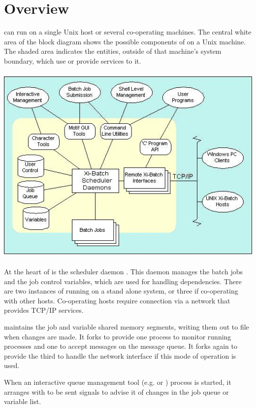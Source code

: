 \chapter{Overview}
\label{chp:overview}
\ProductName{} can run on a single Unix host or several co-operating machines.
The central white area of the block diagram shows the possible components of \ProductName{} on a Unix machine. The shaded area indicates the
entities, outside of that machine's \ProductName{} system boundary, which use or provide services to it.

 \includegraphics[width=13.771cm,height=9.922cm]{img/ref1.jpg} 

At the heart of \ProductName{} is the scheduler daemon . This daemon manages the batch jobs and
the job control variables, which are used for handling dependencies. There are two instances of  running on a
stand alone system, or three if co-operating with other \ProductName{} hosts. Co-operating \ProductName{} hosts require connection via a network that
provides TCP/IP services.

 maintains the job and variable shared memory segments, writing them out to file when changes are made. It
forks to provide one process to monitor running processes and one to accept messages on the message queue. It forks again to provide the
third  to handle the network interface if this mode of operation is used.

When an interactive queue management tool (e.g. \PrBtq{} or \PrXmbtq{}) process is
started, it arranges with  to be sent signals to advise it of changes in the job queue or variable list.

